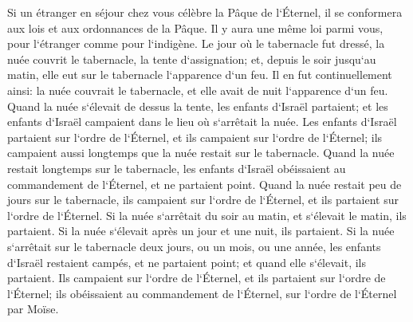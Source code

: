 \verse Si un étranger en séjour chez vous célèbre la Pâque de l`Éternel, il se conformera aux lois et aux ordonnances de la Pâque. Il y aura une même loi parmi vous, pour l`étranger comme pour l`indigène. 
\verse Le jour où le tabernacle fut dressé, la nuée couvrit le tabernacle, la tente d`assignation; et, depuis le soir jusqu`au matin, elle eut sur le tabernacle l`apparence d`un feu. 
\verse Il en fut continuellement ainsi: la nuée couvrait le tabernacle, et elle avait de nuit l`apparence d`un feu. 
\verse Quand la nuée s`élevait de dessus la tente, les enfants d`Israël partaient; et les enfants d`Israël campaient dans le lieu où s`arrêtait la nuée. 
\verse Les enfants d`Israël partaient sur l`ordre de l`Éternel, et ils campaient sur l`ordre de l`Éternel; ils campaient aussi longtemps que la nuée restait sur le tabernacle. 
\verse Quand la nuée restait longtemps sur le tabernacle, les enfants d`Israël obéissaient au commandement de l`Éternel, et ne partaient point. 
\verse Quand la nuée restait peu de jours sur le tabernacle, ils campaient sur l`ordre de l`Éternel, et ils partaient sur l`ordre de l`Éternel. 
\verse Si la nuée s`arrêtait du soir au matin, et s`élevait le matin, ils partaient. Si la nuée s`élevait après un jour et une nuit, ils partaient. 
\verse Si la nuée s`arrêtait sur le tabernacle deux jours, ou un mois, ou une année, les enfants d`Israël restaient campés, et ne partaient point; et quand elle s`élevait, ils partaient. 
\verse Ils campaient sur l`ordre de l`Éternel, et ils partaient sur l`ordre de l`Éternel; ils obéissaient au commandement de l`Éternel, sur l`ordre de l`Éternel par Moïse. 

